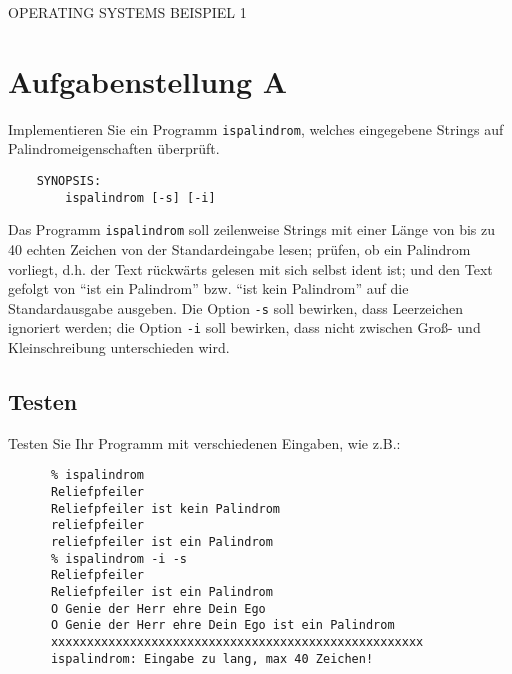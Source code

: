 \documentclass{article}
\begin{document}
\begin{center}
\begin{Large}
OPERATING SYSTEMS BEISPIEL 1
\end{Large}
\end{center}

\section*{Aufgabenstellung A}

Implementieren Sie ein Programm {\tt ispalindrom}, welches
eingegebene Strings auf Palindromeigenschaften überprüft.

\begin{verbatim}
    SYNOPSIS:
        ispalindrom [-s] [-i]
\end{verbatim}

Das Programm {\tt ispalindrom} soll zeilenweise Strings mit einer
Länge von bis zu 40 echten Zeichen von der Standardeingabe lesen;
prüfen, ob ein Palindrom vorliegt, d.h. der Text rückwärts gelesen
mit sich selbst ident ist; und den Text gefolgt von "`ist ein
Palindrom"' bzw. "`ist kein Palindrom"' auf die Standardausgabe
ausgeben. Die Option {\tt -s} soll bewirken, dass Leerzeichen
ignoriert werden; die Option {\tt -i} soll bewirken, dass nicht
zwischen Groß- und Kleinschreibung unterschieden wird.

\subsection*{Testen}

Testen Sie Ihr Programm mit verschiedenen Eingaben, wie z.B.:

\begin{verbatim}
      % ispalindrom
      Reliefpfeiler
      Reliefpfeiler ist kein Palindrom
      reliefpfeiler
      reliefpfeiler ist ein Palindrom
      % ispalindrom -i -s
      Reliefpfeiler
      Reliefpfeiler ist ein Palindrom
      O Genie der Herr ehre Dein Ego
      O Genie der Herr ehre Dein Ego ist ein Palindrom
      xxxxxxxxxxxxxxxxxxxxxxxxxxxxxxxxxxxxxxxxxxxxxxxxxxxx
      ispalindrom: Eingabe zu lang, max 40 Zeichen!
\end{verbatim}
\end{document}
